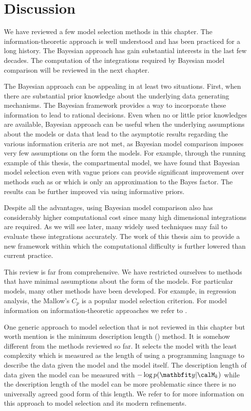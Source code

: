 \section{Discussion}
\label{sec:Model Selection Discussion}

We have reviewed a few model selection methods in this chapter. The
information-theoretic approach is well understood and has been practiced for
a long history. The Bayesian approach has gain substantial interests in the
last few decades. The computation of the integrations required by Bayesian
model comparison will be reviewed in the next chapter.

The Bayesian approach can be appealing in at least two situations. First, when
there are substantial prior knowledge about the underlying data generating
mechanisms. The Bayesian framework provides a way to incorporate these
information to lead to rational decisions. Even when no or little prior
knowledges are available, Bayesian approach can be useful when the underlying
assumptions about the models or data that lead to the asymptotic results
regarding the various information criteria are not met, as Bayesian model
comparison imposes very few assumptions on the form the models. For example,
through the running example of this thesis, the \pet compartmental model, we
have found that Bayesian model selection even with vague priors can provide
significant improvement over methods such as \aicc or \bic which is only an
approximation to the Bayes factor. The results can be further improved via
using informative priors.

Despite all the advantages, using Bayesian model comparison also has
considerably higher computational cost since many high dimensional
integrations are required. As we will see later, many widely used techniques
may fail to evaluate these integrations accurately. The work of this thesis
aim to provide a new framework within which the computational difficulty is
further lowered than current practice.

This review is far from comprehensive. We have restricted ourselves to methods
that have minimal assumptions about the form of the models. For particular
models, many other methods have been developed. For example, in regression
analysis, the Mallow's $C_p$ is a popular model selection criterion. For model
information on information-theoretic approaches we refer to
\cite{Burnham:2002wc,Claeskens:2008tq}.

One generic approach to model selection that is not reviewed in this chapter
but worth mention is the minimum description length (\mdl) method. It is
somehow different from the methods reviewed so far. It selects the model with
the least complexity which is measured as the length of using a programming
language to describe the data given the model and the model itself. The
description length of data given the model can be measured with $-\log
p(\data|\calM_k)$ while the description length of the model can be more
problematic since there is no universally agreed good form of this length. We
refer to \cite{Grunwald:2005vx} for more information on this approach to model
selection and its modern refinements.

